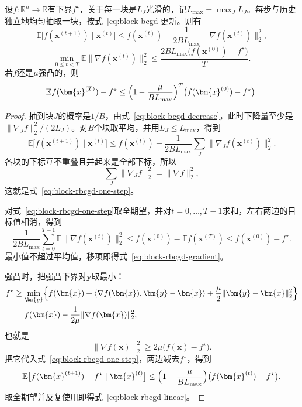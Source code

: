 \begin{theorem}[随机BCGD的收敛率]
\label{thm:block-rbcgd}
设$f:\mathbb{R}^n\to\mathbb{R}$有下界$f^\star$，关于每一块是$L_J$光滑的，记$L_{\max}=\max_JL_J$。每步与历史独立地均匀抽取一块，按式~\eqref{eq:block-bcgd}更新。则有
\begin{equation}
 \mathbb{E}\bigl[f(\bm{x}^{(t+1)})\mid\bm{x}^{(t)}\bigr]\leq f(\bm{x}^{(t)})-\frac{1}{2BL_{\max}}\lVert\nabla f(\bm{x}^{(t)})\rVert_2^2 ,
 \label{eq:block-rbcgd-one-step}
\end{equation}
\begin{equation}
 \min_{0\leq t<T}\mathbb{E}\lVert\nabla f(\bm{x}^{(t)})\rVert_2^2\leq\frac{2BL_{\max}\bigl(f(\bm{x}^{(0)})-f^\star\bigr)}{T}.
 \label{eq:block-rbcgd-gradient}
\end{equation}
若$f$还是$\mu$强凸的，则
\begin{equation}
 \mathbb{E}f(\bm{x}^{(T)})-f^\star\leq\Bigl(1-\frac{\mu}{BL_{\max}}\Bigr)^{T}\bigl(f(\bm{x}^{(0)})-f^\star\bigr).
 \label{eq:block-rbcgd-linear}
\end{equation}
\end{theorem}

\begin{proof}
抽到块$J$的概率是$1/B$，由式~\eqref{eq:block-bcgd-decrease}，此时下降量至少是$\lVert\nabla_Jf\rVert_2^2/(2L_J)$。对$B$个块取平均，并用$L_J\leq L_{\max}$，得到
\[
 \mathbb{E}\bigl[f(\bm{x}^{(t+1)})\mid\bm{x}^{(t)}\bigr]\leq f(\bm{x}^{(t)})-\frac{1}{2BL_{\max}}\sum_J\lVert\nabla_Jf(\bm{x}^{(t)})\rVert_2^2 .
\]
各块的下标互不重叠且并起来是全部下标，所以
\[
 \sum_J\lVert\nabla_Jf\rVert_2^2=\lVert\nabla f\rVert_2^2 ,
\]
这就是式~\eqref{eq:block-rbcgd-one-step}。

对式~\eqref{eq:block-rbcgd-one-step}取全期望，并对$t=0,\ldots,T-1$求和，左右两边的目标值相消，得到
\[
 \frac{1}{2BL_{\max}}\sum_{t=0}^{T-1}\mathbb{E}\lVert\nabla f(\bm{x}^{(t)})\rVert_2^2\leq f(\bm{x}^{(0)})-\mathbb{E}f(\bm{x}^{(T)})\leq f(\bm{x}^{(0)})-f^\star .
\]
最小值不超过平均值，移项即得式~\eqref{eq:block-rbcgd-gradient}。

强凸时，把强凸下界对$\bm{y}$取最小：
\[
 \begin{aligned}
 f^\star&\geq\min_{\bm{y}}\Bigl\{f(\bm{x})+\langle\nabla f(\bm{x}),\bm{y}-\bm{x}\rangle+\frac{\mu}{2}\lVert\bm{y}-\bm{x}\rVert_2^2\Bigr\}\\
 &=f(\bm{x})-\frac{1}{2\mu}\lVert\nabla f(\bm{x})\rVert_2^2 ,
 \end{aligned}
\]
也就是
\[
 \lVert\nabla f(\bm{x})\rVert_2^2\geq2\mu\bigl(f(\bm{x})-f^\star\bigr).
\]
把它代入式~\eqref{eq:block-rbcgd-one-step}，两边减去$f^\star$，得到
\[
 \mathbb{E}\bigl[f(\bm{x}^{(t+1)})-f^\star\mid\bm{x}^{(t)}\bigr]\leq\Bigl(1-\frac{\mu}{BL_{\max}}\Bigr)\bigl(f(\bm{x}^{(t)})-f^\star\bigr).
\]
取全期望并反复使用即得式~\eqref{eq:block-rbcgd-linear}。
\end{proof}

